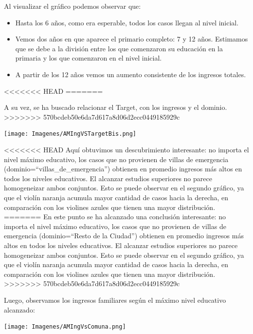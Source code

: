 \documentclass[a4paper]{article}
\begin{document}
        Al visualizar el gráfico podemos observar que:
 
        \begin{itemize}
            \item Hasta los 6 años, como era esperable, todos los casos llegan al nivel inicial.
            \item Vemos dos años en que aparece el primario completo: 7 y 12 años. Estimamos que se debe a la división entre los que comenzaron su educación en la primaria y los que comenzaron en el nivel inicial.
            \item A partir de los 12 años vemos un aumento consistente de los ingresos totales.
        \end{itemize}
<<<<<<< HEAD
=======

        A su vez, se ha buscado relacionar el Target, con los ingresos y el dominio.
>>>>>>> 570bcdeb50e6da7d617a8d06d2ecc0449185929c
 
        \begin{center}
            \texttt{[image: Imagenes/AMIngVSTargetBis.png]}
        \end{center}
 
<<<<<<< HEAD
        Aquí obtuvimos un descubrimiento interesante: no importa el nivel máximo educativo, los casos que no provienen de villas de emergencia (dominio=``villas\_de\_emergencia'') obtienen en promedio ingresos más altos en todos los niveles educativos. El alcanzar estudios superiores no parece homogeneizar ambos conjuntos. Esto se puede observar en el segundo gráfico, ya que el violín naranja acumula mayor cantidad de casos hacia la derecha, en comparación con los violines azules que tienen una mayor distribución.
=======
        En este punto se ha alcanzado una conclusión interesante: no importa el nivel máximo educativo, los casos que no provienen de villas de emergencia (dominio=``Resto de la Ciudad'') obtienen en promedio ingresos más altos en todos los niveles educativos. El alcanzar estudios superiores no parece homogeneizar ambos conjuntos. Esto se puede observar en el segundo gráfico, ya que el violín naranja acumula mayor cantidad de casos hacia la derecha, en comparación con los violines azules que tienen una mayor distribución.
>>>>>>> 570bcdeb50e6da7d617a8d06d2ecc0449185929c
        
        \newpage

        Luego, observamos los ingresos familiares según el máximo nivel educativo alcanzado:
        \begin{center}
            \texttt{[image: Imagenes/AMIngVsComuna.png]}
        \end{center}
 
\end{document}
